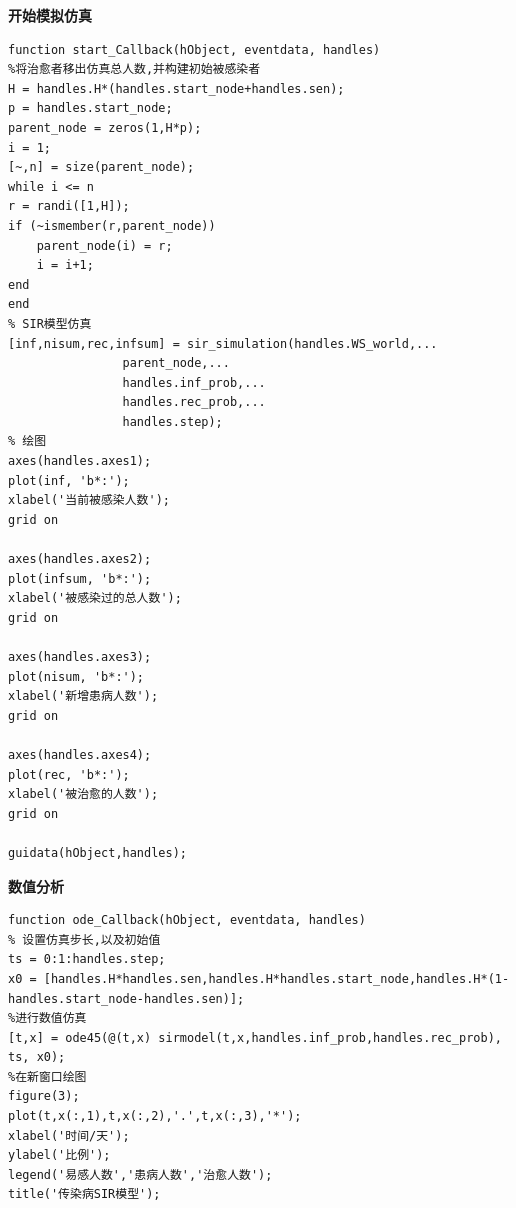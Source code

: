 \documentclass[supercite]{HustGraduPaper}
\begin{document}
	\textbf{开始模拟仿真}\par
	\begin{lstlisting}
function start_Callback(hObject, eventdata, handles)
%将治愈者移出仿真总人数,并构建初始被感染者
H = handles.H*(handles.start_node+handles.sen);
p = handles.start_node;
parent_node = zeros(1,H*p);
i = 1;
[~,n] = size(parent_node);
while i <= n
r = randi([1,H]);
if (~ismember(r,parent_node))
    parent_node(i) = r;
    i = i+1;
end
end 
% SIR模型仿真
[inf,nisum,rec,infsum] = sir_simulation(handles.WS_world,...
				parent_node,...
				handles.inf_prob,...
				handles.rec_prob,...
				handles.step);
% 绘图
axes(handles.axes1);
plot(inf, 'b*:');
xlabel('当前被感染人数');
grid on

axes(handles.axes2);
plot(infsum, 'b*:');
xlabel('被感染过的总人数');
grid on

axes(handles.axes3);
plot(nisum, 'b*:');
xlabel('新增患病人数');
grid on

axes(handles.axes4);
plot(rec, 'b*:');
xlabel('被治愈的人数');
grid on

guidata(hObject,handles);
	\end{lstlisting}

	\textbf{数值分析} \par
	\begin{lstlisting}
function ode_Callback(hObject, eventdata, handles)
% 设置仿真步长,以及初始值
ts = 0:1:handles.step;
x0 = [handles.H*handles.sen,handles.H*handles.start_node,handles.H*(1-handles.start_node-handles.sen)];
%进行数值仿真
[t,x] = ode45(@(t,x) sirmodel(t,x,handles.inf_prob,handles.rec_prob), ts, x0);
%在新窗口绘图
figure(3);
plot(t,x(:,1),t,x(:,2),'.',t,x(:,3),'*');
xlabel('时间/天');
ylabel('比例');
legend('易感人数','患病人数','治愈人数');
title('传染病SIR模型');
	\end{lstlisting}
\end{document}
